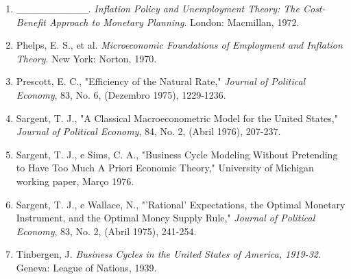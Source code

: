 \documentclass[12pt]{article}
\begin{document}
\begin{enumerate}
    \item \_\_\_\_\_\_\_\_\_\_. \textit{Inflation Policy and Unemployment Theory: The Cost-Benefit Approach to Monetary Planning}. London: Macmillan, 1972.
    \item Phelps, E. S., et al. \textit{Microeconomic Foundations of Employment and Inflation Theory}. New York: Norton, 1970.
    \item Prescott, E. C., "Efficiency of the Natural Rate," \textit{Journal of Political Economy}, 83, No. 6, (Dezembro 1975), 1229-1236.
    \item Sargent, T. J., "A Classical Macroeconometric Model for the United States," \textit{Journal of Political Economy}, 84, No. 2, (Abril 1976), 207-237.
    \item Sargent, T. J., e Sims, C. A., "Business Cycle Modeling Without Pretending to Have Too Much A Priori Economic Theory," University of Michigan working paper, Março 1976.
    \item Sargent, T. J., e Wallace, N., "'Rational' Expectations, the Optimal Monetary Instrument, and the Optimal Money Supply Rule," \textit{Journal of Political Economy}, 83, No. 2, (Abril 1975), 241-254.
    \item Tinbergen, J. \textit{Business Cycles in the United States of America, 1919-32}. Geneva: League of Nations, 1939.
\end{enumerate}
\end{document}

